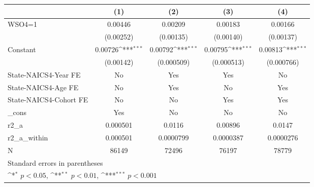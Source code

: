 {
\def\sym#1{\ifmmode^{#1}\else\(^{#1}\)\fi}
\begin{tabular}{l*{4}{c}}
\hline\hline
                    &\multicolumn{1}{c}{(1)}         &\multicolumn{1}{c}{(2)}         &\multicolumn{1}{c}{(3)}         &\multicolumn{1}{c}{(4)}         \\
\hline
WSO4=1              &     0.00446         &     0.00209         &     0.00183         &     0.00166         \\
                    &   (0.00252)         &   (0.00135)         &   (0.00140)         &   (0.00137)         \\
[1em]
Constant            &     0.00726\sym{***}&     0.00792\sym{***}&     0.00795\sym{***}&     0.00813\sym{***}\\
                    &   (0.00142)         &  (0.000509)         &  (0.000513)         &  (0.000766)         \\
[1em]
State-NAICS4-Year FE&          No         &         Yes         &         Yes         &          No         \\
[1em]
State-NAICS4-Age FE &          No         &         Yes         &          No         &         Yes         \\
[1em]
State-NAICS4-Cohort FE&          No         &          No         &         Yes         &         Yes         \\
[1em]
\_cons              &         Yes         &          No         &          No         &          No         \\
\hline
r2\_a                &    0.000501         &      0.0116         &     0.00896         &      0.0147         \\
r2\_a\_within         &    0.000501         &   0.0000799         &   0.0000387         &   0.0000276         \\
N                   &       86149         &       72496         &       76197         &       78779         \\
\hline\hline
\multicolumn{5}{l}{\footnotesize Standard errors in parentheses}\\
\multicolumn{5}{l}{\footnotesize \sym{*} \(p<0.05\), \sym{**} \(p<0.01\), \sym{***} \(p<0.001\)}\\
\end{tabular}
}
